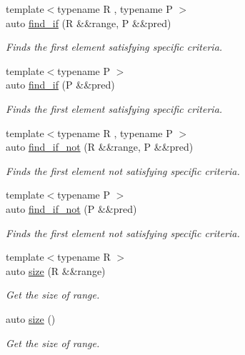 \begin{DoxyCompactItemize}
{\footnotesize template$<$typename R , typename P $>$ }\\auto \mbox{\hyperlink{namespace_r_a_h___n_a_m_e_s_p_a_c_e_a17f32b471719285bd12cea80d2611d4e}{find\+\_\+if}} (R \&\&range, P \&\&pred)
\begin{DoxyCompactList}\small\item\em Finds the first element satisfying specific criteria. \end{DoxyCompactList}\item 
{\footnotesize template$<$typename P $>$ }\\auto \mbox{\hyperlink{namespace_r_a_h___n_a_m_e_s_p_a_c_e_a7e890baf36c953a1839b7c71c069cb50}{find\+\_\+if}} (P \&\&pred)
\begin{DoxyCompactList}\small\item\em Finds the first element satisfying specific criteria. \end{DoxyCompactList}\item 
{\footnotesize template$<$typename R , typename P $>$ }\\auto \mbox{\hyperlink{namespace_r_a_h___n_a_m_e_s_p_a_c_e_af151731e0c4d4cae20f1c3c3ea92cd1b}{find\+\_\+if\+\_\+not}} (R \&\&range, P \&\&pred)
\begin{DoxyCompactList}\small\item\em Finds the first element not satisfying specific criteria. \end{DoxyCompactList}\item 
{\footnotesize template$<$typename P $>$ }\\auto \mbox{\hyperlink{namespace_r_a_h___n_a_m_e_s_p_a_c_e_a583e285f755eb8a41e23446718e14d18}{find\+\_\+if\+\_\+not}} (P \&\&pred)
\begin{DoxyCompactList}\small\item\em Finds the first element not satisfying specific criteria. \end{DoxyCompactList}\item 
{\footnotesize template$<$typename R $>$ }\\auto \mbox{\hyperlink{namespace_r_a_h___n_a_m_e_s_p_a_c_e_a9741e7a14ce65a685c365223a6dd55c7}{size}} (R \&\&range)
\begin{DoxyCompactList}\small\item\em Get the size of range. \end{DoxyCompactList}\item 
auto \mbox{\hyperlink{namespace_r_a_h___n_a_m_e_s_p_a_c_e_a70f0d40418ca1878f19bafdb3d823f27}{size}} ()
\begin{DoxyCompactList}\small\item\em Get the size of range. \end{DoxyCompactList}\item 

\end{DoxyCompactItemize}
